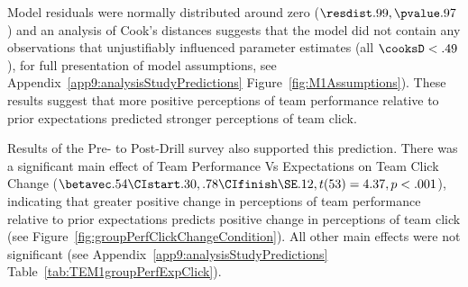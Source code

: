\begin{CJK}{UTF8}{gbsn}
Model residuals were normally distributed around zero ($\resdist .99, \pvalue .97$) and an analysis of Cook's distances suggests that the model did not contain any observations that unjustifiably influenced parameter estimates (all $\cooksD < .49$), for full presentation of model assumptions, see Appendix~\ref{app9:analysisStudyPredictions} Figure~\ref{fig:M1Assumptions}).  These results suggest that more positive perceptions of team performance relative to prior expectations predicted stronger perceptions of team click.


Results of the Pre- to Post-Drill survey also supported this prediction.  There was a significant main effect of Team Performance Vs Expectations on Team Click Change ($\betavec .54 \CIstart .30, .78 \CIfinish \SE .12, t(53) = 4.37, p < .001$), indicating that greater positive change in perceptions of team performance relative to prior expectations predicts positive change in perceptions of team click (see Figure~\ref{fig:groupPerfClickChangeCondition}).  All other main effects were not significant (see Appendix~\ref{app9:analysisStudyPredictions} Table~\ref{tab:TEM1groupPerfExpClick}).





\end{CJK}
